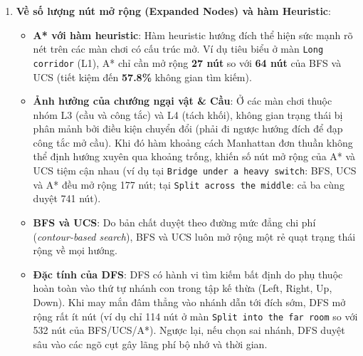\documentclass[12pt,a4paper]{article}
\begin{document}
\begin{enumerate}
    \item \textbf{Về số lượng nút mở rộng (Expanded Nodes) và hàm Heuristic}:
    \begin{itemize}
        \item \textbf{A* với hàm heuristic}: Hàm heuristic hướng đích thể hiện sức mạnh rõ nét trên các màn chơi có cấu trúc mở. Ví dụ tiêu biểu ở màn \texttt{Long corridor} (L1), A* chỉ cần mở rộng \textbf{27 nút} so với \textbf{64 nút} của BFS và UCS (tiết kiệm đến \textbf{57.8\%} không gian tìm kiếm).
        \item \textbf{Ảnh hưởng của chướng ngại vật \& Cầu}: Ở các màn chơi thuộc nhóm L3 (cầu và công tắc) và L4 (tách khối), không gian trạng thái bị phân mảnh bởi điều kiện chuyển đổi (phải đi ngược hướng đích để đạp công tắc mở cầu). Khi đó hàm khoảng cách Manhattan đơn thuần không thể định hướng xuyên qua khoảng trống, khiến số nút mở rộng của A* và UCS tiệm cận nhau (ví dụ tại \texttt{Bridge under a heavy switch}: BFS, UCS và A* đều mở rộng 177 nút; tại \texttt{Split across the middle}: cả ba cùng duyệt 741 nút).
        \item \textbf{BFS và UCS}: Do bản chất duyệt theo đường mức đẳng chi phí (\textit{contour-based search}), BFS và UCS luôn mở rộng một rẻ quạt trạng thái rộng về mọi hướng.
        \item \textbf{Đặc tính của DFS}: DFS có hành vi tìm kiếm bất định do phụ thuộc hoàn toàn vào thứ tự nhánh con trong tập kế thừa (Left, Right, Up, Down). Khi may mắn đâm thẳng vào nhánh dẫn tới đích sớm, DFS mở rộng rất ít nút (ví dụ chỉ 114 nút ở màn \texttt{Split into the far room} so với 532 nút của BFS/UCS/A*). Ngược lại, nếu chọn sai nhánh, DFS duyệt sâu vào các ngõ cụt gây lãng phí bộ nhớ và thời gian.
    \end{itemize}


\end{enumerate}
\end{document}
